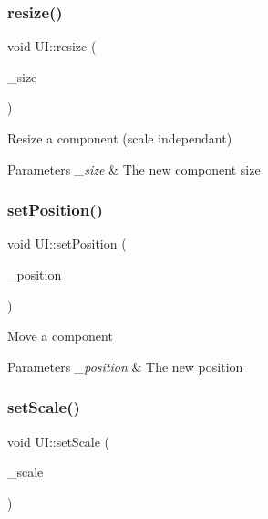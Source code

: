\mbox{\label{class_u_i_a934f9deb6d5b34dfe7e510fcecab9331}} 
\subsubsection{\texorpdfstring{resize()}{resize()}}
{\footnotesize\ttfamily void U\+I\+::resize (\begin{DoxyParamCaption}\item[{Im\+Vec2}]{\+\_\+size }\end{DoxyParamCaption})\hspace{0.3cm}{\ttfamily [inline]}}

Resize a component (scale independant) 
\begin{DoxyParams}{Parameters}
{\em \+\_\+size} & The new component size \\
\hline
\end{DoxyParams}
\mbox{\label{class_u_i_a3613f4288872eb4498a74929f7923144}} 
\subsubsection{\texorpdfstring{set\+Position()}{setPosition()}}
{\footnotesize\ttfamily void U\+I\+::set\+Position (\begin{DoxyParamCaption}\item[{Im\+Vec2}]{\+\_\+position }\end{DoxyParamCaption})\hspace{0.3cm}{\ttfamily [inline]}}

Move a component 
\begin{DoxyParams}{Parameters}
{\em \+\_\+position} & The new position \\
\hline
\end{DoxyParams}
\mbox{\label{class_u_i_a9f94b46f9c35e31475bfbf1b3d3509d4}} 
\subsubsection{\texorpdfstring{set\+Scale()}{setScale()}}
{\footnotesize\ttfamily void U\+I\+::set\+Scale (\begin{DoxyParamCaption}\item[{const float}]{\+\_\+scale }\end{DoxyParamCaption})\hspace{0.3cm}{\ttfamily [inline]}}

